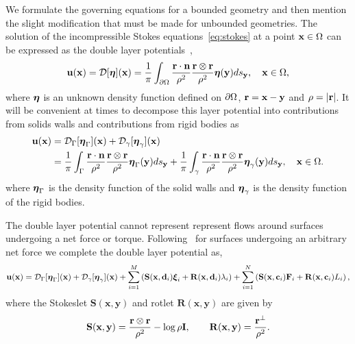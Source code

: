 \documentclass[preprint, 10pt]{elsarticle}
\begin{document}
We formulate the governing equations for a bounded geometry and then
mention the slight modification that must be made for unbounded
geometries.  The solution of the incompressible Stokes
equations~\eqref{eq:stokes} at a point ${\mathbf{x}} \in \Omega$ can be expressed
as the double layer potentials~\cite{Ladyzhenskaya1963, Pozrikidis1992},
\begin{align}
  \label{eq:dlp}
  {\mathbf{u}}({\mathbf{x}}) = {\mathcal{D}}[{\boldsymbol\eta}]({\mathbf{x}}) = \frac{1}{\pi}\int_{{\partial}\Omega}
  \frac{{\mathbf{r}}\cdot\mathbf{n}}{\rho^2}\frac{{\mathbf{r}} \otimes {\mathbf{r}}}{\rho^2}
  {\boldsymbol\eta}({\mathbf{y}}) ds_{{\mathbf{y}}}, \quad {\mathbf{x}} \in \Omega,
\end{align}
where ${\boldsymbol\eta}$ is an unknown density function defined  on ${\partial}\Omega$,
${\mathbf{r}} = {\mathbf{x}} - {\mathbf{y}}$ and $\rho=|{\mathbf{r}}|$.  It will be convenient at times to
decompose this layer potential into contributions from solids walls and
contributions from rigid bodies as
\begin{align*}
  {\mathbf{u}}({\mathbf{x}}) &= {\mathcal{D}}_\Gamma[{\boldsymbol\eta}_\Gamma]({\mathbf{x}}) + 
              {\mathcal{D}}_\gamma[{\boldsymbol\eta}_\gamma]({\mathbf{x}}) \\
           &= \frac{1}{\pi}\int_{\Gamma}
              \frac{{\mathbf{r}}\cdot\mathbf{n}}{\rho^2}
              \frac{{\mathbf{r}} \otimes {\mathbf{r}}}{\rho^2}
              {\boldsymbol\eta}_\Gamma({\mathbf{y}}) ds_{{\mathbf{y}}} + 
              \frac{1}{\pi}\int_{\gamma}
              \frac{{\mathbf{r}}\cdot\mathbf{n}}{\rho^2}
              \frac{{\mathbf{r}} \otimes {\mathbf{r}}}{\rho^2}
              {\boldsymbol\eta}_\gamma({\mathbf{y}}) ds_{{\mathbf{y}}}, \quad {\mathbf{x}} \in \Omega.
\end{align*}
where ${\boldsymbol\eta}_\Gamma$ is the density function of the solid walls and
${\boldsymbol\eta}_\gamma$ is the density function of the rigid bodies.

The double layer potential cannot represent represent flows around
surfaces undergoing a net force or torque.  Following~\cite{Power1987,
Power1993} for surfaces undergoing an arbitrary net force we complete
the double layer potential as,
\begin{align*}
  {\mathbf{u}}({\mathbf{x}}) = {\mathcal{D}}_\Gamma[{\boldsymbol\eta}_\Gamma]({\mathbf{x}}) + 
             {\mathcal{D}}_\gamma[{\boldsymbol\eta}_\gamma]({\mathbf{x}}) + 
             \sum_{i=1}^M \left(\mathbf{S}({\mathbf{x}},{\mathbf{d}}_i){\boldsymbol{\xi}}_i + 
                \mathbf{R}({\mathbf{x}},{\mathbf{d}}_i)\lambda_i\right) + 
             \sum_{i=1}^N \left(\mathbf{S}({\mathbf{x}},{\mathbf{c}}_i){\mathbf{F}}_i + 
                \mathbf{R}({\mathbf{x}},{\mathbf{c}}_i)L_i\right),
\end{align*}
where the Stokeslet $\mathbf{S}(\mathbf{x},\mathbf{y})$ and rotlet $\mathbf{R}(\mathbf{x},\mathbf{y})$ are given by
\begin{align*}
  \mathbf{S}({\mathbf{x}},{\mathbf{y}}) = \frac{{\mathbf{r}} \otimes {\mathbf{r}}}{\rho^2} - 
  \log\rho\mathbf{I}, \qquad 
  \mathbf{R}({\mathbf{x}},{\mathbf{y}}) = \frac{{\mathbf{r}}^\perp}{\rho^2}.
\end{align*}
\end{document}
